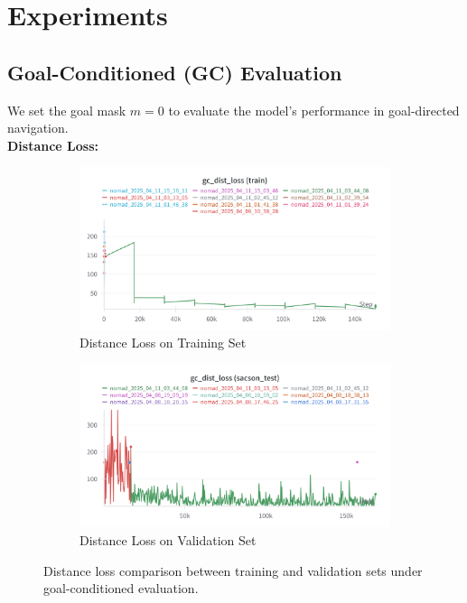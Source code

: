 \documentclass[12pt]{article}
\begin{document}
\section{Experiments}
\subsection*{Goal-Conditioned (GC) Evaluation}
We set the goal mask $m = 0$ to evaluate the model's performance in goal-directed navigation.\\
\noindent \textbf{Distance Loss:}\\
\begin{figure}[H]
    \centering
    \begin{subfigure}[b]{0.48\textwidth}
        \centering
        \includegraphics[width=\textwidth]{images/gc_distloss_nomad.png}
        \caption{Distance Loss on Training Set}
        \label{fig:gc_dist_loss_train}
    \end{subfigure}
    \hfill
    \begin{subfigure}[b]{0.48\textwidth}
        \centering
        \includegraphics[width=\textwidth]{images/gc_dist_loss_test.png}
        \caption{Distance Loss on Validation Set}
        \label{fig:gc_dist_loss_val}
    \end{subfigure}
    \caption{Distance loss comparison between training and validation sets under goal-conditioned evaluation.}
\end{figure}
\end{document}
